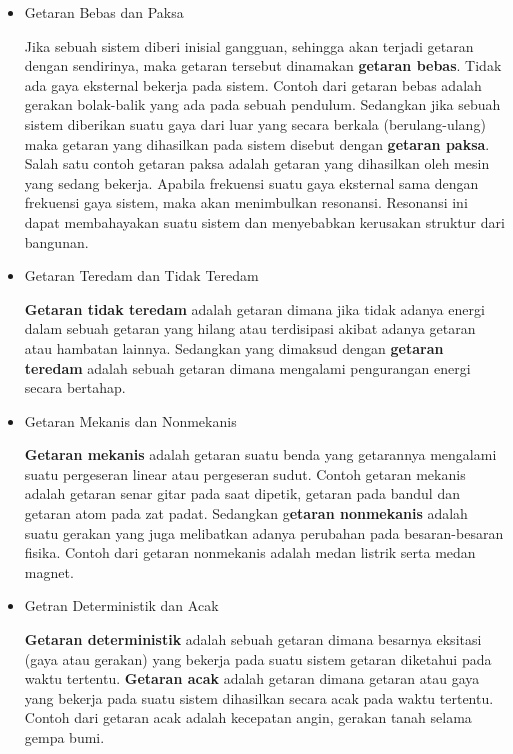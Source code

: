 \begin{itemize}
	\item Getaran Bebas dan Paksa
	
	Jika sebuah sistem diberi inisial gangguan, sehingga akan terjadi getaran dengan sendirinya, maka getaran tersebut dinamakan \textbf{getaran bebas}. Tidak ada gaya eksternal bekerja pada sistem. Contoh dari getaran bebas adalah gerakan bolak-balik yang ada pada sebuah pendulum. Sedangkan jika sebuah sistem diberikan suatu gaya dari luar yang secara berkala (berulang-ulang) maka getaran yang dihasilkan pada sistem disebut dengan \textbf{getaran paksa}. Salah satu contoh getaran paksa adalah getaran yang dihasilkan oleh mesin yang sedang bekerja. Apabila frekuensi suatu gaya eksternal sama dengan frekuensi gaya sistem, maka akan menimbulkan resonansi. Resonansi ini dapat membahayakan suatu sistem dan menyebabkan kerusakan struktur dari bangunan.
	
	\item Getaran Teredam dan Tidak Teredam
	
	\textbf{Getaran tidak teredam} adalah getaran dimana jika tidak adanya energi dalam sebuah getaran yang hilang atau terdisipasi akibat adanya getaran atau hambatan lainnya. Sedangkan yang dimaksud dengan \textbf{getaran teredam} adalah sebuah getaran dimana mengalami pengurangan energi secara bertahap.
	
	\item Getaran Mekanis dan Nonmekanis
	
	\textbf{Getaran mekanis} adalah getaran suatu benda yang getarannya mengalami suatu pergeseran linear atau pergeseran sudut. Contoh getaran mekanis adalah getaran senar gitar pada saat dipetik, getaran pada bandul dan getaran atom pada zat padat. Sedangkan g\textbf{etaran nonmekanis} adalah suatu gerakan yang juga melibatkan adanya perubahan pada besaran-besaran fisika. Contoh dari getaran nonmekanis adalah medan listrik serta medan magnet.
	
	\item Getran Deterministik dan Acak
	
	\textbf{Getaran deterministik} adalah sebuah getaran dimana besarnya eksitasi (gaya atau gerakan) yang bekerja pada suatu sistem getaran diketahui pada waktu tertentu. \textbf{Getaran acak} adalah getaran dimana getaran atau gaya yang bekerja pada suatu sistem dihasilkan secara acak pada waktu tertentu. Contoh dari getaran acak adalah kecepatan angin, gerakan tanah selama gempa bumi.
\end{itemize}

